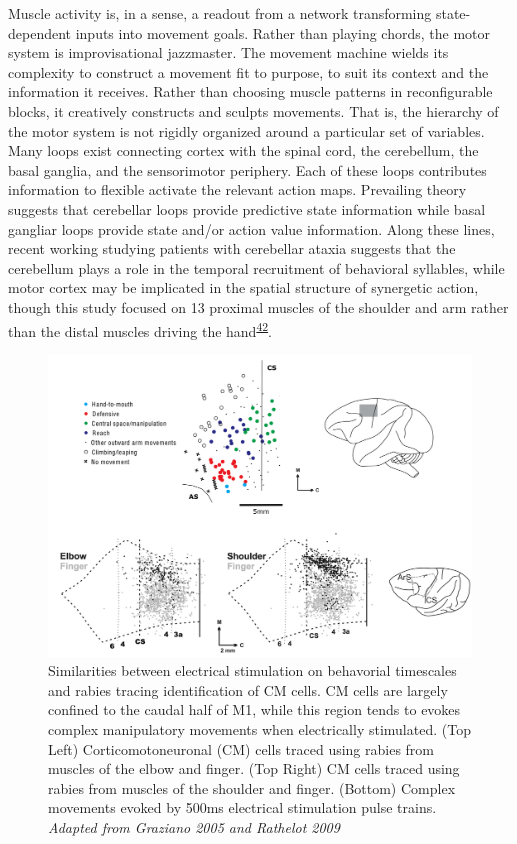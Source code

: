 \documentclass[
  a4paper,
]{article}
\begin{document}
Muscle activity is, in a sense, a readout from a network transforming
state-dependent inputs into movement goals. Rather than playing chords,
the motor system is improvisational jazzmaster. The movement machine
wields its complexity to construct a movement fit to purpose, to suit
its context and the information it receives. Rather than choosing muscle
patterns in reconfigurable blocks, it creatively constructs and sculpts
movements. That is, the hierarchy of the motor system is not rigidly
organized around a particular set of variables. Many loops exist
connecting cortex with the spinal cord, the cerebellum, the basal
ganglia, and the sensorimotor periphery. Each of these loops contributes
information to flexible activate the relevant action maps. Prevailing
theory suggests that cerebellar loops provide predictive state
information while basal gangliar loops provide state and/or action value
information. Along these lines, recent working studying patients with
cerebellar ataxia suggests that the cerebellum plays a role in the
temporal recruitment of behavioral syllables, while motor cortex may be
implicated in the spatial structure of synergetic action, though this
study focused on 13 proximal muscles of the shoulder and arm rather than
the distal muscles driving the
hand\textsuperscript{\protect\hyperlink{ref-bergerDoesCerebellumShape2020}{42}}.

\begin{figure}
\hypertarget{fig:rathelot_graziano}{%
\centering
\includegraphics{images/physiology/rathelot_graziano.png}
\caption{Similarities between electrical stimulation on behavorial
timescales and rabies tracing identification of CM cells. CM cells are
largely confined to the caudal half of M1, while this region tends to
evokes complex manipulatory movements when electrically stimulated. (Top
Left) Corticomotoneuronal (CM) cells traced using rabies from muscles of
the elbow and finger. (Top Right) CM cells traced using rabies from
muscles of the shoulder and finger. (Bottom) Complex movements evoked by
500ms electrical stimulation pulse trains. \emph{Adapted from Graziano
2005 and Rathelot 2009}}\label{fig:rathelot_graziano}
}
\end{figure}
\end{document}
